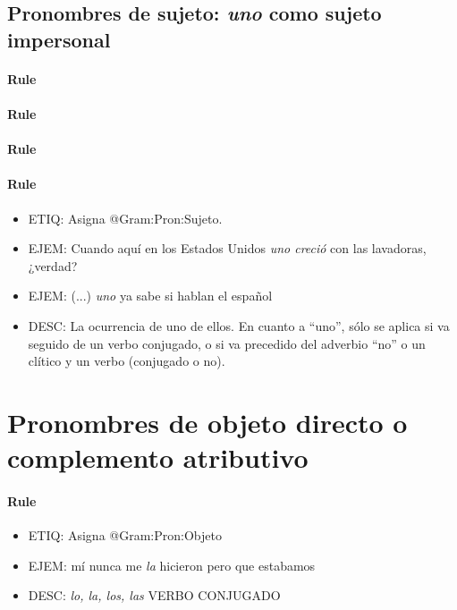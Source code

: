 \documentclass[11pt]{report}
\begin{document}
\subsection{Pronombres de sujeto: \emph{uno} como sujeto impersonal}
\paragraph*{Rule}
\paragraph*{Rule}
\paragraph*{Rule}
\paragraph*{Rule}
\begin{itemize}
\item ETIQ: Asigna @Gram:Pron:Sujeto.
\item EJEM: Cuando aquí en los Estados Unidos \emph{uno creció} con las lavadoras, ¿verdad? 
\item EJEM: (...) \emph{uno} ya sabe si hablan el español
\item DESC: La ocurrencia de uno de ellos. En cuanto a ``uno'', sólo se aplica si va seguido de un verbo conjugado, o si va precedido del adverbio ``no'' o un clítico y un verbo (conjugado o no).
\end{itemize}

\section{Pronombres de objeto directo o complemento atributivo}
\paragraph*{Rule}
\begin{itemize}
\item ETIQ: Asigna @Gram:Pron:Objeto
\item EJEM: mí nunca me \emph{la} hicieron pero que estabamos
\item DESC: \emph{lo, la, los, las} VERBO CONJUGADO
\end{itemize}
\end{document}
